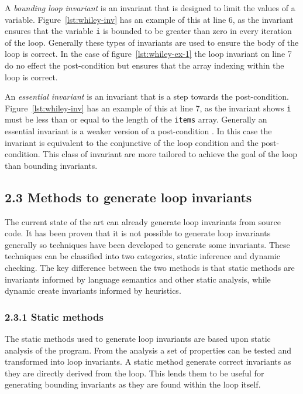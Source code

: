 \documentclass[11pt, a4paper, twoside, openright]{report}
\newcommand{\code}[1]{\texttt{#1}}
\begin{document}
A \textit{bounding loop invariant} is an invariant that is designed
to limit the values of a variable.
Figure~\ref{lst:whiley-inv} has an example of this at line 6, as the invariant
ensures that the variable \code{i} is bounded to be greater than zero
in every iteration of the loop.
Generally these types of invariants are used to ensure the body of the loop
is correct. In the case of figure~\ref{lst:whiley-ex-1} the loop invariant on line
7 do no effect the post-condition but ensures that the array indexing within
the loop is correct.

An \textit{essential invariant} is an invariant that is a step towards the
post-condition.
Figure~\ref{lst:whiley-inv} has an example of this at line 7,
as the invariant shows \code{i} must be less than or
equal to the length of the \code{items} array.
Generally an essential invariant is a weaker version of a post-condition
\cite{invarints-classifiction}.
In this case the invariant is equivalent to the conjunctive
of the loop condition and the post-condition.
This class of invariant are more tailored to achieve
the goal of the loop than bounding invariants.


\subsection*{2.3 Methods to generate loop invariants}

The current state of the art can already generate loop invariants
from source code.
It has been proven that it is not possible to generate loop invariants
generally %
so techniques have been developed to generate some invariants.
These techniques can be classified into two categories,
static inference and dynamic checking.
The key difference between the two methods
is that static methods are invariants informed by
language semantics and other static analysis, while
dynamic create invariants informed by heuristics.

\subsubsection*{2.3.1 Static methods}

The static methods used to generate loop invariants are based upon static
analysis of the program.
From the analysis a set of properties can be tested and transformed
into loop invariants.
A static method generate correct invariants as they are directly
derived from the loop. This lends them to be useful for generating
bounding invariants as they are found within the loop itself.
\cite{benderfinding}
\cite{Leino2005LoopIO}
\end{document}
